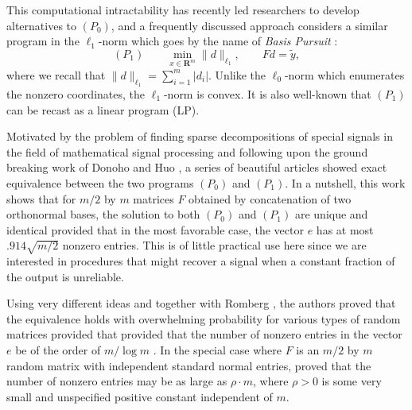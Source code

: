 \documentclass[11pt]{article}
\def\R{{{\mathbf{R}}}} %
\newcommand{\<}{\langle}
\renewcommand{\>}{\rangle}
\numberwithin{equation}{section}
\begin{document}
This computational intractability has recently led researchers to
develop alternatives to $(P_0)$, and a frequently discussed approach
considers a similar program in the $\ell_1$-norm which goes by
the name of {\em Basis Pursuit} \cite{BP}:
\begin{equation}
\label{eq:(P_1)}
(P_1)\quad \quad  \min_{x \in \R^m} 
\|d\|_{\ell_1}, \qquad F d = \tilde y, 
\end{equation}
where we recall that $\|d\|_{\ell_1} = \sum_{i = 1}^m |d_i|$.  Unlike
the $\ell_0$-norm which enumerates the nonzero coordinates, the
$\ell_1$-norm is convex. It is also well-known \cite{Bloomfield} that
$(P_1)$ can be recast as a linear program (LP).

Motivated by the problem of finding sparse decompositions of special
signals in the field of mathematical signal processing and following
upon the ground breaking work of Donoho and Huo \cite{DonohoHuo}, a
series of beautiful articles
\cite{GribonvalNielsen,DonohoElad,EladBruckstein,Tropp03} showed exact
equivalence between the two programs $(P_0)$ and $(P_1)$. In a
nutshell, this work shows that for $m/2$ by $m$ matrices $F$ obtained
by concatenation of two orthonormal bases, the solution to both
$(P_0)$ and $(P_1)$ are unique and identical provided that in the most
favorable case, the vector $e$ has at most $.914 \sqrt{m/2}$ nonzero
entries. This is of little practical use here since we are interested
in procedures that might recover a signal when a constant fraction of
the output is unreliable.

Using very different ideas and together with Romberg \cite{CRT}, the
authors proved that the equivalence holds with overwhelming
probability for various types of random matrices provided that
provided that the number of nonzero entries in the vector $e$ be of
the order of $m/\log m$ \cite{RandomBP,OptimalRecovery}. In the
special case where $F$ is an $m/2$ by $m$ random matrix with
independent standard normal entries, \cite{Equivl0l1} proved that the
number of nonzero entries may be as large as $\rho \cdot m$, where
$\rho > 0$ is some very small and unspecified positive constant
independent of $m$.
\end{document}
